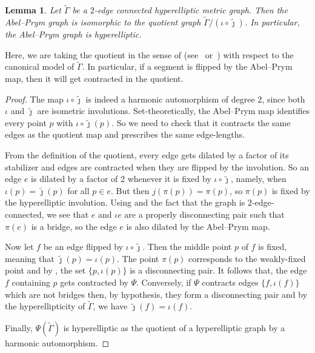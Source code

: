 \documentclass[11pt]{article}
\newtheorem{lemma}[theo]{Lemma}
\theoremstyle{definition}
\numberwithin{equation}{section}
\theoremstyle{definition}
\newcommand{\tGa}{\widetilde{\Gamma}}
\newcommand{\tj}{\widetilde{\jmath}}
\newcommand{\wt}[1]{\widetilde{#1}}
\begin{document}
 
 \begin{lemma}\label{lem:quotientbyinvolution}
Let $\wt\Gamma$ be a $2$-edge connected  hyperelliptic metric graph. Then the Abel--Prym graph is isomorphic to the quotient graph $\tGa/{(\iota\circ \tj)}$. In particular, the Abel--Prym graph is hyperelliptic.
     \end{lemma}


Here, we are taking the quotient in the sense of (see~\cite[Section~2.2]{CH} or~\cite[Section~1.3]{LenUlirschZakharov_abelianCovers}) with respect to the canonical model of $\wt\Gamma$. In particular, if a segment is flipped by the Abel--Prym map, then it will get contracted in the quotient.  

  \begin{proof}  \label{graphModuloIJ}
The map $\iota\circ \tj$ is indeed a harmonic automorphism of degree $2$, since 
  both $\iota$ and $\tj$ are isometric involutions. 
    Set-theoretically,  the Abel--Prym map identifies every point $p$ with $\iota\circ\tj(p)$. So we need to check that it contracts the same edges as  the quotient map  and prescribes the same edge-lengths.

From the definition of the quotient,  
every edge gets dilated by a factor of its stabilizer and edges are contracted when they are flipped by the involution. So an edge $e$ is dilated by a factor of 2 whenever it is fixed by $\iota\circ\tj$, namely, when $\iota(p) = \tj(p)$ for all $p\in e$. But then $j(\pi(p)) = \pi(p)$, so $\pi(p)$ is fixed by the hyperelliptic involution. Using  and the fact that the graph is 2-edge-connected, we see that $e$ and $\iota e$ are a properly disconnecting pair such that $\pi(e)$ is a bridge, so the edge $e$ is also dilated by the Abel--Prym map. 
   
  Now let $f$ be an edge flipped by $\iota\circ\tj$. Then the middle point $p$ of $f$ is fixed, meaning that $\tj(p)=\iota(p)$. The point $\pi(p)$ corresponds to the weakly-fixed point  
 and  by , the set $\{p,\iota(p)\}$ is a disconnecting pair. It follows that, the edge $f$ containing $p$  gets contracted by $\Psi$. Conversely, if $\Psi$ contracts edges $\{f,\iota(f)\}$ which are not bridges then, by hypothesis, they form a disconnecting pair and by the hyperellipticity of $\tGa$, we have $\tj(f)=\iota(f)$.
  
         Finally, $\Psi(\wt\Gamma)$ is hyperelliptic as the quotient of a hyperelliptic graph by a harmonic automorphism.  
\end{proof}
\end{document}
